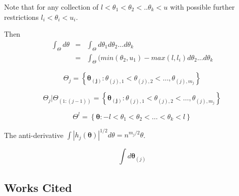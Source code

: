 \documentclass[Proceedings]{ascelike}
\begin{document}
Note that for any collection of $l<\theta_1 < \theta_2 < .. \theta_k< u$ with possible further restrictions $l_i < \theta_i < u_i$.

Then
\begin{eqnarray}
  \int_{\Theta} d\theta  &=& \int_{\Theta} d\theta_{1}d\theta_{2}\ldots d\theta_{k}\\
  &=& \int_{\Theta} (min(\theta_2, u_1)-max(l, l_i) d\theta_{2}\ldots d\theta_{k}
\end{eqnarray}

\[
\Theta_j = \left\{ \boldsymbol{\theta_{(j)}} : \theta_{(j),1} < \theta_{(j),2} <  \ldots,
\theta_{(j),m_j} \right\}
\]

\[
\Theta_j|\Theta_{(1:(j-1))} = \left\{ \boldsymbol{\theta_{(j)}} :
\theta_{(j),1} < \theta_{(j),2} <  \ldots,
\theta_{(j),m_j} \right\}
\]



\[
\Theta^l = \left\{ \boldsymbol{\theta} : -l < \theta_1 <\theta_2 < \ldots < \theta_k < l \right\}
\]


The anti-derivative $\int |h_j(\boldsymbol{\theta})|^{1/2} d\theta = n^{m_j/2}\theta$. 



\[
\int d\boldsymbol{\theta}_{(j)}
\]








\subsection*{Works Cited}\label{section:references}
%
%

%
%
%
\end{document}
